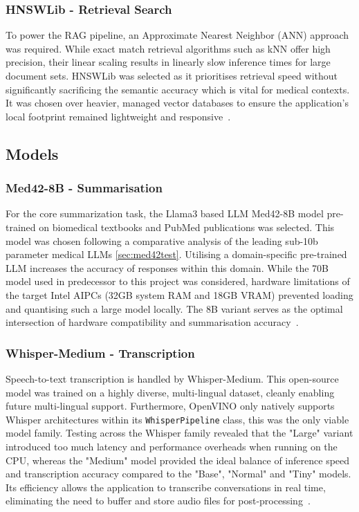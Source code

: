 \subsubsection{HNSWLib - Retrieval Search}
To power the RAG pipeline, an Approximate Nearest Neighbor (ANN) approach was required. While exact match retrieval algorithms such as kNN offer high precision, their linear scaling results in linearly slow inference times for large document sets. HNSWLib was selected as it prioritises retrieval speed without significantly sacrificing the semantic accuracy which is vital for medical contexts. It was chosen over heavier, managed vector databases to ensure the application's local footprint remained lightweight and responsive~\cite{malkov2018efficient}.

\subsection{Models}
\subsubsection{Med42-8B - Summarisation}
For the core summarization task, the Llama3 based LLM Med42-8B model pre-trained on biomedical textbooks and PubMed publications was selected. This model was chosen following a comparative analysis of the leading sub-10b parameter medical LLMs \ref{sec:med42test}. Utilising a domain-specific pre-trained LLM increases the accuracy of responses within this domain\cite{nissen2025medicine}. While the 70B model used in predecessor to this project was considered, hardware limitations of the target Intel AIPCs (32GB system RAM and 18GB VRAM) prevented loading and quantising such a large model locally. The 8B variant serves as the optimal intersection of hardware compatibility and summarisation accuracy~\cite{med42_2023}.

\subsubsection{Whisper-Medium - Transcription}
Speech-to-text transcription is handled by Whisper-Medium. This open-source model was trained on a highly diverse, multi-lingual dataset, cleanly enabling future multi-lingual support. Furthermore, OpenVINO only natively supports Whisper architectures within its \texttt{WhisperPipeline} class, this was the only viable model family. Testing across the Whisper family revealed that the "Large" variant introduced too much latency and performance overheads when running on the CPU, whereas the "Medium" model provided the ideal balance of inference speed and transcription accuracy compared to the "Base", "Normal" and "Tiny" models. Its efficiency allows the application to transcribe conversations in real time, eliminating the need to buffer and store audio files for post-processing~\cite{radford2023robust}.

